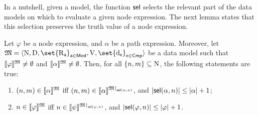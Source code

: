 In a nutshell, given a model, the function $\operatorname{\mathsf{sel}}$ selects the relevant part of the data models on which to evaluate a given node expression. The next lemma states that this selection preserves the truth value of a node expression.

\begin{lemma}\label{lemma:selection}
    Let $\varphi$ be a node expression, and $\alpha$ be a path expression.
    Moreover, let ${\model = \tup{\N, \D, \set{\R_{\apath}}_{\apath \in \mods}, \valuation,\set{\data_\cmp}_{\cmp \in \cmps}}}$ be a data model such that ${\llbracket{\varphi}\rrbracket^{\mathfrak{M}}\neq\emptyset}$ and ${\llbracket{\alpha}\rrbracket^{\mathfrak{M}}\neq\emptyset}$.
    Then, for all $\{n,m\}\subseteq\mathrm{N}$, the following statements are true:
    \begin{enumerate}[1.]
        \setlength{\itemsep}{0pt}
        \item $(n,m)\in\llbracket{\alpha}\rrbracket^{\mathfrak{M}}$ iff $(n,m)\in\llbracket{\alpha}\rrbracket^{\mathfrak{M}{\restriction}_{\operatorname{\mathsf{sel}}(\alpha,n)}}$, and ${\mid}{\operatorname{\mathsf{sel}}(\alpha,n)}{\mid} \leq {\mid}{\alpha}{\mid} + 1$;
        \item $n\in\llbracket{\varphi}\rrbracket^{\mathfrak{M}}$ iff $n\in\llbracket{\psi}\rrbracket^{\mathfrak{M}{\restriction}_{\operatorname{\mathsf{sel}}(\varphi,n)}}$, and ${\mid}{\operatorname{\mathsf{sel}}(\varphi,n)}{\mid} \leq {\mid}{\varphi}{\mid} + 1$.
    \end{enumerate} 
\end{lemma}

